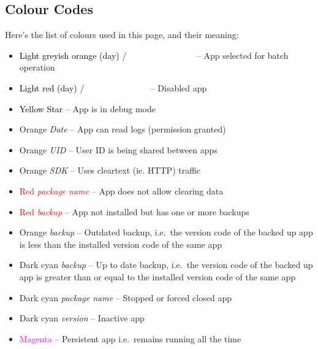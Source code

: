 \subsection{Colour Codes}\label{subsec:main-colour-codes} %
Here's the list of colours used in this page, and their meaning:
\begin{itemize}
    \item \colorbox{AMLightGreyishOrange}{\textcolor{black}{Light greyish orange (day)}} / \colorbox{AMDarkBlue}{
        \textcolor{white}{dark blue (night)}} -- App selected for batch operation
    \item \colorbox{AMLightRed}{\textcolor{black}{Light red (day)}} / \colorbox{AMVeryDarkRed}{
        \textcolor{white}{dark red (night)}} -- Disabled app
    \item \colorbox{AMYellow}{\textcolor{black}{Yellow Star}} -- App is in debug mode
    \item \textcolor{AMOrange}{Orange \textit{Date}} -- App can read logs (permission granted)
    \item \textcolor{AMOrange}{Orange \textit{UID}} -- User ID is being shared between apps
    \item \textcolor{AMOrange}{Orange \textit{SDK}} -- Uses cleartext (ie. HTTP) traffic
    \item \textcolor{red}{Red \textit{package name}} -- App does not allow clearing data
    \item \textcolor{red}{Red \textit{backup}} -- App not installed but has one or more backups
    \item \textcolor{AMOrange}{Orange \textit{backup}} -- Outdated backup, i.e.\ the version code of the backed up app
    is less than the installed version code of the same app
    \item \textcolor{AMDarkCyan}{Dark cyan \textit{backup}} -- Up to date backup, i.e.\ the version code of the backed
    up app is greater than or equal to the installed version code of the same app
    \item \textcolor{AMDarkCyan}{Dark cyan \textit{package name}} -- Stopped or forced closed app
    \item \textcolor{AMDarkCyan}{Dark cyan \textit{version}} -- Inactive app
    \item \textcolor{magenta}{Magenta} -- Persistent app i.e.\ remains running all the time
\end{itemize}

